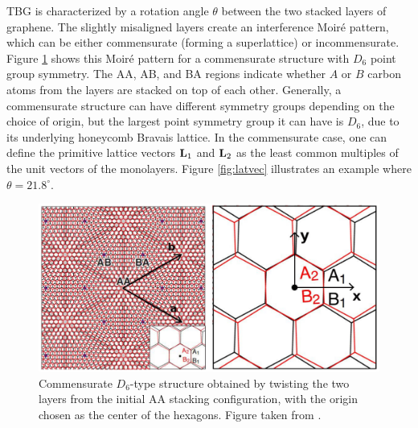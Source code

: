 \documentclass[12pt]{report}
\begin{document}
TBG is characterized by a rotation angle $\theta$ between the two stacked layers of graphene. The slightly misaligned layers create an interference Moiré pattern, which can be either commensurate (forming a superlattice) or incommensurate. Figure \ref{fig:moireD6} shows this Moiré pattern for a commensurate structure with $D_6$ point group symmetry. The AA, AB, and BA regions indicate whether $A$ or $B$ carbon atoms from the layers are stacked on top of each other. Generally, a commensurate structure can have different symmetry groups depending on the choice of origin, but the largest point symmetry group it can have is $D_6$, due to its underlying honeycomb Bravais lattice. In the commensurate case, one can define the primitive lattice vectors $\vb{L}_1$ and $\vb{L}_2$ as the least common multiples of the unit vectors of the monolayers. Figure \ref{fig:latvec} illustrates an example where $\theta = 21.8^\circ$.
\begin{figure}[H]
\centering
\includegraphics[height=.32\columnwidth]{fig/moireD6.png}
\caption{Commensurate $D_6$-type structure obtained by twisting the two layers from the initial AA stacking configuration, with the origin chosen as the center of the hexagons. Figure taken from \cite{thesis_rennella}.}
\label{fig:moireD6}
\end{figure}
\end{document}
